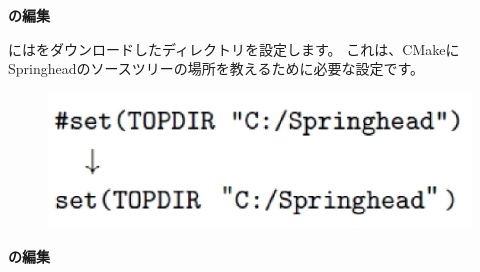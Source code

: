 \bigskip
\noindent
\bf{\CMakeTopdir{}}の編集
\begin{narrow}[20pt]
	\CMakeTopdir{}には\SprLib をダウンロードしたディレクトリを設定します。
	これは、CMakeにSpringheadのソースツリーの場所を教えるために必要な設定です。

\ifLwarp
	\begin{figure}[h]
	    \begin{center}
	    \includegraphics[width=\textwidth]{fig/command-3-1-b.eps}
	    \end{center}
	    \label{fig:DownloadTree}
	\end{figure}
\else
	\begin{narrow}[15pt]
	\end{narrow}
\fi
\end{narrow}
\medskip
\noindent
\bf{\CMakeLists{}}の編集
